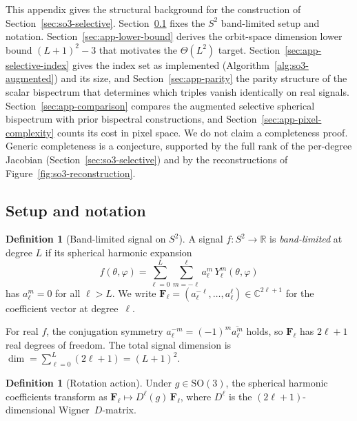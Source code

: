 \documentclass{article}
\theoremstyle{definition}
\newtheorem{definition}[theorem]{Definition}
\theoremstyle{remark}
\newcommand{\R}{\mathbb{R}}
\newcommand{\C}{\mathbb{C}}
\newcommand{\SO}{\mathrm{SO}}
\newcommand{\SH}{Y}
\newcommand{\conj}[1]{\overline{#1}}
\theoremstyle{definition}
\begin{document}
This appendix gives the structural background for the construction
of Section~\ref{sec:so3-selective}. Section~\ref{sec:app-setup} fixes the $S^2$ band-limited
setup and notation. Section~\ref{sec:app-lower-bound} derives the orbit-space dimension
lower bound $(L{+}1)^2-3$ that motivates the $\Theta(L^2)$ target.
Section~\ref{sec:app-selective-index} gives the index set as implemented
(Algorithm~\ref{alg:so3-augmented}) and its size, and Section~\ref{sec:app-parity} the parity
structure of the scalar bispectrum that determines which triples vanish
identically on real signals. Section~\ref{sec:app-comparison} compares the augmented selective spherical bispectrum with prior
bispectral constructions, and Section~\ref{sec:app-pixel-complexity} counts its cost in
pixel space. We do not claim a completeness proof. Generic completeness
is a conjecture, supported by the full rank of the per-degree Jacobian
(Section~\ref{sec:so3-selective}) and by
the reconstructions of Figure~\ref{fig:so3-reconstruction}.

\subsection{Setup and notation}
\label{sec:app-setup}

\begin{definition}[Band-limited signal on $S^2$]
A signal $f : S^2 \to \R$ is \emph{band-limited} at degree $L$ if its
spherical harmonic expansion
\begin{equation}\label{eq:app-sh-expansion}
  f(\theta, \varphi)
  = \sum_{\ell=0}^{L} \sum_{m=-\ell}^{\ell}
    a_\ell^m \, \SH_\ell^m(\theta, \varphi)
\end{equation}
has $a_\ell^m = 0$ for all $\ell > L$. We write
$\mathbf{F}_\ell = (a_\ell^{-\ell}, \dotsc, a_\ell^{\ell})
  \in \C^{2\ell+1}$
for the coefficient vector at degree~$\ell$.
\end{definition}

\noindent
For real $f$, the conjugation symmetry
$a_\ell^{-m} = (-1)^m \conj{a_\ell^m}$ holds, so
$\mathbf{F}_\ell$ has $2\ell+1$ real degrees of freedom.
The total signal dimension is
$\dim = \sum_{\ell=0}^{L}(2\ell+1) = (L+1)^2$.

\begin{definition}[Rotation action]
Under $g \in \SO(3)$, the spherical harmonic coefficients transform as
$\mathbf{F}_\ell \mapsto D^\ell(g)\,\mathbf{F}_\ell$,
where $D^\ell$ is the $(2\ell+1)$-dimensional Wigner~$D$-matrix.
\end{definition}
\end{document}
